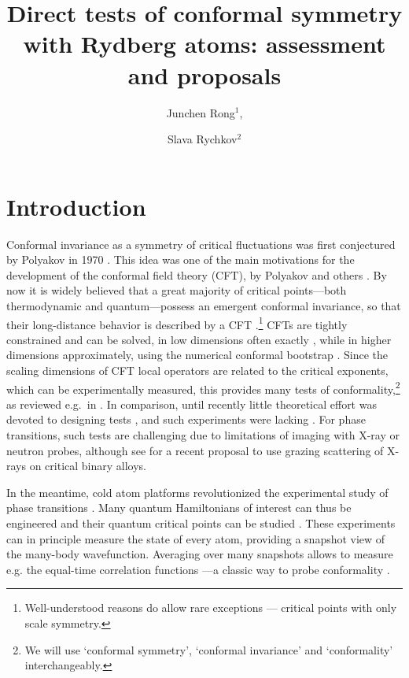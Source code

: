 \documentclass[a4paper,11pt]{article}
\title{Direct tests of conformal symmetry with Rydberg atoms: assessment and proposals}
\author{Junchen Rong$^1$,}
\author{Slava Rychkov$^2$}
\affiliation{$^1$CPHT, CNRS, \'Ecole Polytechnique, Institut Polytechnique de Paris, Palaiseau, France\\
$^2$Institut des Hautes \'Etudes Scientifiques, 91440 Bures-sur-Yvette, France}
\theoremstyle{remark}
\theoremstyle{theorem}
\begin{document}
 
	
	\maketitle
	
	\flushbottom


\flushbottom

\section{Introduction}

Conformal invariance as a symmetry of critical fluctuations was first
conjectured by Polyakov in 1970 {\cite{Polyakov:1970xd}}. This idea was one of
the main motivations for the development of the conformal field theory (CFT),
by Polyakov and others {\cite{Polyakov:1974gs,Belavin:1984vu}}. By now it is
widely believed that a great majority of critical points---both thermodynamic
and quantum---possess an emergent conformal invariance, so that their
long-distance behavior is described by a CFT
{\cite{Cardy1987,Cardy:1996xt,tsvelik,giamarchi2003quantum,sachdev,fradkin}}.\footnote{Well-understood
	reasons {\cite{Polchinski:1987dy,Nakayama:2013is}} do allow rare exceptions
	--- critical points with only scale symmetry.} CFTs are tightly constrained
and can be solved, in low dimensions often exactly
{\cite{DiFrancesco:1997nk}}, while in higher dimensions approximately, using
the numerical conformal bootstrap {\cite{Poland:2016chs,Poland:2018epd,Poland:2022qrs,Rychkov:2023wsd}}. Since the scaling
dimensions of CFT local operators are related to the critical exponents, which
can be experimentally measured, this provides many
 tests of conformality,\footnote{We will use
	`conformal symmetry', `conformal invariance' and `conformality'
	interchangeably.} as reviewed e.g.~in {\cite{Henkel1999,Rychkov:2025zks}}. In
comparison, until recently little theoretical effort was devoted to designing
 tests {\cite{Pokrovskii1973,Gompper1985}}, and such
experiments were lacking {\cite{Rychkov:2025zks}}. For
 phase transitions, such tests are
challenging due to limitations of imaging with X-ray or neutron probes, although see
{\cite{Podo:2026hfh}} for a recent proposal to use grazing scattering of
X-rays on critical binary alloys.

In the meantime, cold atom platforms {\cite{Browaeys:2020kzz,Morgado:2020jfo}}
revolutionized the experimental study of  phase
transitions
{\cite{Bernien:2017ubn,Scholl:2020hzx,Ebadi:2020ldi,Semeghini:2021wls}}. Many
quantum Hamiltonians of interest can thus be engineered and their quantum
critical points can be studied
{\cite{Keesling:2018ish,Fang:2024uyf,Sun:2026aqf}}. These experiments can in
principle measure the state of every atom, providing a snapshot view of the
many-body wavefunction. Averaging over many snapshots allows to measure e.g.
the equal-time correlation functions
{\cite{Fang:2024uyf,Emperauger:2025raf}}---a classic way to probe conformality
{\cite{Polyakov:1970xd}}.
\end{document}
